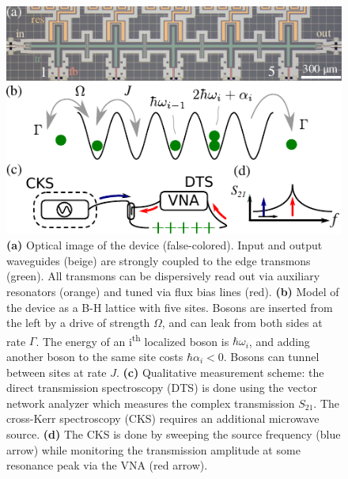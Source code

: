 \documentclass[%
 aps, prl,
 amsmath,amssymb,
 reprint,%
superscriptaddress
]{revtex4-2}
\begin{document}
\begin{figure}
	\centering
	\includegraphics[width=1\linewidth]{Pictures/scheme.pdf}
	\caption{\textbf{(a)} Optical image of the device (false-colored). Input and output waveguides (beige) are strongly coupled to the edge transmons (green). All transmons can be dispersively read out via auxiliary resonators (orange) and tuned via flux bias lines (red). \textbf{(b)} Model of the device as a B-H lattice with five sites. Bosons are inserted from the left by a drive of strength $\Omega$, and can leak from both sides at rate $\Gamma$. The energy of an i\textsuperscript{{th}} localized boson is $\hbar \omega_i$, and adding another boson to the same site costs $\hbar \alpha_i < 0$. Bosons can tunnel between sites at rate $J$. \textbf{(c)} Qualitative measurement scheme: the direct transmission spectroscopy (DTS) is done using the vector network analyzer which measures the complex transmission $ S_{21} $. The cross-Kerr spectroscopy (CKS) requires an additional microwave source. \textbf{(d)} The CKS is done by sweeping the source frequency (blue arrow) while monitoring the transmission amplitude at some resonance peak via the VNA (red arrow).}
	\label{fig:scheme}
\end{figure}
	
\end{document}

